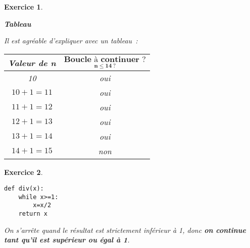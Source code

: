 \documentclass[10pt]{article}
\newtheorem{exo}{Exercice}
\begin{document}
\begin{exo}
\begin{multicols}{4}
\columnbreak

\begin{center}
\textbf{Tableau}
\end{center}

Il est agréable d'expliquer avec un tableau~:

\begin{center}


\begin{tabular}{|c|c|} \hline
\textbf{Valeur de n}& $\underset{\mathbf{\text{n}\leq 14~?}}{\textbf{Boucle à continuer~?}}$\\ \hline
10& oui\\ \hline
$10+1=11$& oui\\ \hline
$11+1=12$&oui\\ \hline
$12+1=13$&oui\\ \hline
$13+1=14$&oui \\ \hline
$14+1=15$&non\\ \hline
\end{tabular}
\end{center}

\end{multicols}

\end{exo}

\begin{exo}

~{}

\begin{lstlisting}
def div(x):
	while x>=1:
		x=x/2
	return x
\end{lstlisting}



\medskip

\danger On s'arrête quand le résultat est strictement inférieur à 1, donc \textbf{on continue tant qu'il est supérieur ou égal à 1}.
\end{exo}
\end{document}
